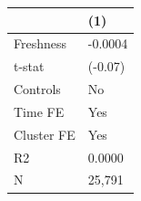 \begin{tabular}{ll}
\toprule
{} &      (1) \\
\midrule
Freshness  &  -0.0004 \\
t-stat     &  (-0.07) \\
Controls   &       No \\
Time FE    &      Yes \\
Cluster FE &      Yes \\
R2         &   0.0000 \\
N          &   25,791 \\
\bottomrule
\end{tabular}
